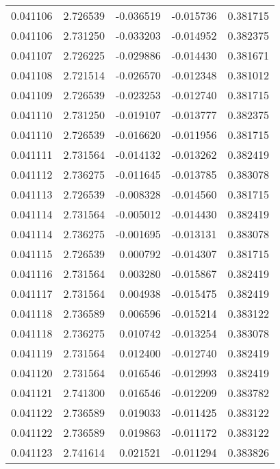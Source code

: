 \begin{tabular}{lrrrr}
0.041106    &  2.726539 & -0.036519 & -0.015736 &             0.381715 \\
0.041106    &  2.731250 & -0.033203 & -0.014952 &             0.382375 \\
0.041107    &  2.726225 & -0.029886 & -0.014430 &             0.381671 \\
0.041108    &  2.721514 & -0.026570 & -0.012348 &             0.381012 \\
0.041109    &  2.726539 & -0.023253 & -0.012740 &             0.381715 \\
0.041110    &  2.731250 & -0.019107 & -0.013777 &             0.382375 \\
0.041110    &  2.726539 & -0.016620 & -0.011956 &             0.381715 \\
0.041111    &  2.731564 & -0.014132 & -0.013262 &             0.382419 \\
0.041112    &  2.736275 & -0.011645 & -0.013785 &             0.383078 \\
0.041113    &  2.726539 & -0.008328 & -0.014560 &             0.381715 \\
0.041114    &  2.731564 & -0.005012 & -0.014430 &             0.382419 \\
0.041114    &  2.736275 & -0.001695 & -0.013131 &             0.383078 \\
0.041115    &  2.726539 &  0.000792 & -0.014307 &             0.381715 \\
0.041116    &  2.731564 &  0.003280 & -0.015867 &             0.382419 \\
0.041117    &  2.731564 &  0.004938 & -0.015475 &             0.382419 \\
0.041118    &  2.736589 &  0.006596 & -0.015214 &             0.383122 \\
0.041118    &  2.736275 &  0.010742 & -0.013254 &             0.383078 \\
0.041119    &  2.731564 &  0.012400 & -0.012740 &             0.382419 \\
0.041120    &  2.731564 &  0.016546 & -0.012993 &             0.382419 \\
0.041121    &  2.741300 &  0.016546 & -0.012209 &             0.383782 \\
0.041122    &  2.736589 &  0.019033 & -0.011425 &             0.383122 \\
0.041122    &  2.736589 &  0.019863 & -0.011172 &             0.383122 \\
0.041123    &  2.741614 &  0.021521 & -0.011294 &             0.383826 \\

\end{tabular}
